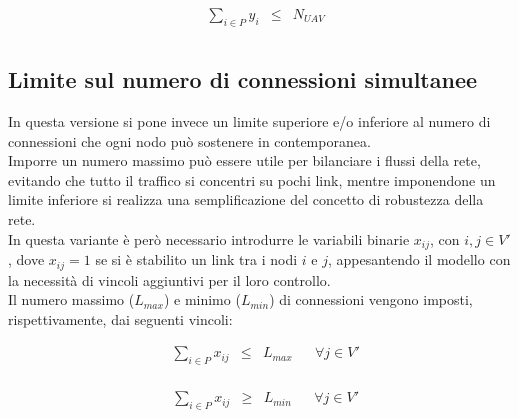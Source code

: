 \begin{equation*} \label{eq:-4_4}
	\begin{array}{rrclcl}
		& \displaystyle \sum_{i \in P} y_{i} & \leq & N_{UAV}\\
	\end{array}
\end{equation*} 
 
\subsection{Limite sul numero di connessioni simultanee}
In questa versione si pone invece un limite superiore e/o inferiore al numero di connessioni che ogni nodo può sostenere in contemporanea. \\
Imporre un numero massimo può essere utile per bilanciare i flussi della rete, evitando che tutto il traffico si concentri su pochi link, mentre imponendone  un limite inferiore si realizza una semplificazione del concetto di robustezza della rete. \\
In questa variante è però necessario introdurre le variabili binarie $x_{ij}$, con $i,j \in V'$, dove $x_{ij} = 1$ se si è stabilito un link tra i nodi $i$ e $j$, appesantendo il modello con la necessità di vincoli aggiuntivi per il loro controllo. \\
Il numero massimo ($L_{max}$) e minimo ($L_{min}$) di connessioni vengono imposti, rispettivamente, dai seguenti vincoli:

\begin{equation*} \label{eq:max}
	\begin{array}{rrclcl}
		& \displaystyle \sum_{i \in P} x_{ij} & \leq & L_{max} && \forall j \in V' \\
	\end{array}
\end{equation*} 

\begin{equation*} \label{eq:min}
\begin{array}{rrclcl}
	& \displaystyle \sum_{i \in P} x_{ij} & \geq & L_{min} && \forall j \in V' \\
\end{array}
\end{equation*} 


